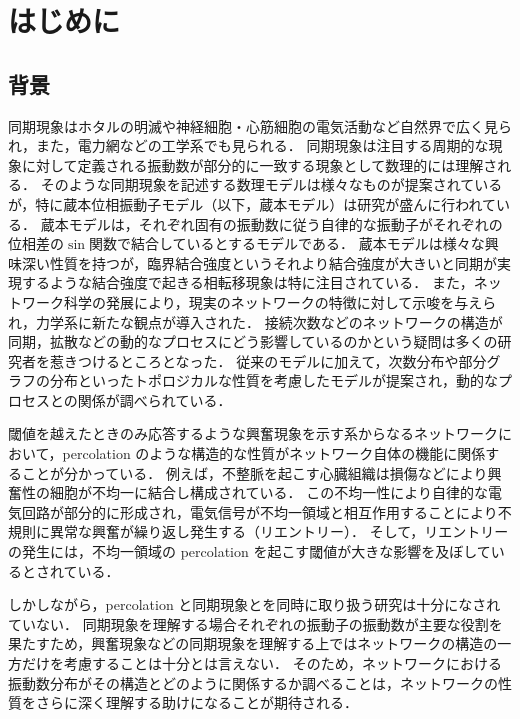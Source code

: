 \documentclass[../main]{subfiles}
\begin{document}
\chapter{はじめに}
\section{背景}
\label{chap:intro-back}
同期現象はホタルの明滅や神経細胞・心筋細胞の電気活動など自然界で広く見られ\cite{Strogatz1993}，また，電力網などの工学系でも見られる\cite{Dorfler2012}．
同期現象は注目する周期的な現象に対して定義される振動数が部分的に一致する現象として数理的には理解される．
そのような同期現象を記述する数理モデルは様々なもの\cite{Winfree1967,kuramoto1975}が提案されているが，特に蔵本位相振動子モデル（以下，蔵本モデル）は研究が盛んに行われている\cite{RevModPhys.77.137}．
蔵本モデルは，それぞれ固有の振動数に従う自律的な振動子がそれぞれの位相差の$\sin$関数で結合しているとするモデルである．
蔵本モデルは様々な興味深い性質を持つが，臨界結合強度というそれより結合強度が大きいと同期が実現するような結合強度で起きる相転移現象は特に注目されている\cite{RevModPhys.77.137,RODRIGUES20161}．
また，ネットワーク科学の発展により，現実のネットワークの特徴に対して示唆を与えられ，力学系に新たな観点が導入された\cite{RODRIGUES20161}．
接続次数などのネットワークの構造が同期，拡散などの動的なプロセスにどう影響しているのかという疑問は多くの研究者を惹きつけるところとなった．
従来のモデルに加えて，次数分布や部分グラフの分布といったトポロジカルな性質を考慮したモデルが提案され，動的なプロセスとの関係が調べられている\cite{Moreno_2004,PhysRevLett.106.128701,Liu2013,PhysRevLett.124.218301}．

閾値を越えたときのみ応答するような興奮現象を示す系からなるネットワークにおいて，percolation のような構造的な性質がネットワーク自体の機能に関係することが分かっている\cite{PhysRevLett.110.158101,Pasquale2008SelforganizationAN}．
例えば，不整脈を起こす心臓組織は損傷などにより興奮性の細胞が不均一に結合し構成されている．
この不均一性により自律的な電気回路が部分的に形成され，電気信号が不均一領域と相互作用することにより不規則に異常な興奮が繰り返し発生する（リエントリー）．
そして，リエントリーの発生には，不均一領域の percolation を起こす閾値が大きな影響を及ぼしているとされている\cite{PhysRevLett.110.158101}．

しかしながら，percolation と同期現象とを同時に取り扱う研究は十分になされていない．
同期現象を理解する場合それぞれの振動子の振動数が主要な役割を果たすため，興奮現象などの同期現象を理解する上ではネットワークの構造の一方だけを考慮することは十分とは言えない．
そのため，ネットワークにおける振動数分布がその構造とどのように関係するか調べることは，ネットワークの性質をさらに深く理解する助けになることが期待される．
\end{document}
